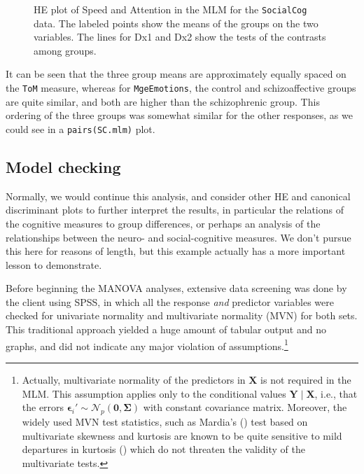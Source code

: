 \documentclass[
  letterpaper,
  10pt,
  krantz2]{krantz}
\begin{document}
{\begin{figure}[H]
{}

\caption{\label{fig-SC-HEplot}HE plot of Speed and Attention in the MLM
for the \texttt{SocialCog} data. The labeled points show the means of
the groups on the two variables. The lines for Dx1 and Dx2 show the
tests of the contrasts among groups.}

\end{figure}%

It can be seen that the three group means are approximately equally
spaced on the \texttt{ToM} measure, whereas for \texttt{MgeEmotions},
the control and schizoaffective groups are quite similar, and both are
higher than the schizophrenic group. This ordering of the three groups
was somewhat similar for the other responses, as we could see in a
\texttt{pairs(SC.mlm)} plot.

\subsection{Model checking}\label{model-checking}

Normally, we would continue this analysis, and consider other HE and
canonical discriminant plots to further interpret the results, in
particular the relations of the cognitive measures to group differences,
or perhaps an analysis of the relationships between the neuro- and
social-cognitive measures. We don't pursue this here for reasons of
length, but this example actually has a more important lesson to
demonstrate.

Before beginning the MANOVA analyses, extensive data screening was done
by the client using SPSS, in which all the response \emph{and} predictor
variables were checked for univariate normality and multivariate
normality (MVN) for both sets. This traditional approach yielded a huge
amount of tabular output and no graphs, and did not indicate any major
violation of assumptions.\footnote{Actually, multivariate normality of
  the predictors in \(\mathbf{X}\) is not required in the MLM. This
  assumption applies only to the conditional values
  \(\mathbf{Y} \;|\; \mathbf{X}\), i.e., that the errors
  \(\mathbf{\epsilon}_{i}' \sim \mathcal{N}_{p}(\mathbf{0},\boldsymbol{\Sigma})\)
  with constant covariance matrix. Moreover, the widely used MVN test
  statistics, such as Mardia's ()
  test based on multivariate skewness and kurtosis are known to be quite
  sensitive to mild departures in kurtosis
  () which do not threaten the
  validity of the multivariate tests.}

}
\end{document}
